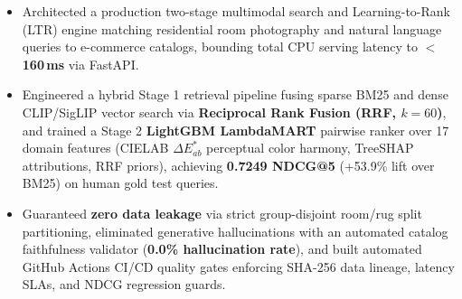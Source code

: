 

\begin{itemize}
    \item Architected a production two-stage multimodal search and Learning-to-Rank (LTR) engine matching residential room photography and natural language queries to e-commerce catalogs, bounding total CPU serving latency to \textbf{$<$ 160\,ms} via FastAPI.
    \item Engineered a hybrid Stage 1 retrieval pipeline fusing sparse BM25 and dense CLIP/SigLIP vector search via \textbf{Reciprocal Rank Fusion (RRF, $k=60$)}, and trained a Stage 2 \textbf{LightGBM LambdaMART} pairwise ranker over 17 domain features (CIELAB $\Delta E^*_{ab}$ perceptual color harmony, TreeSHAP attributions, RRF priors), achieving \textbf{0.7249 NDCG@5} (+53.9\% lift over BM25) on human gold test queries.
    \item Guaranteed \textbf{zero data leakage} via strict group-disjoint room/rug split partitioning, eliminated generative hallucinations with an automated catalog faithfulness validator (\textbf{0.0\% hallucination rate}), and built automated GitHub Actions CI/CD quality gates enforcing SHA-256 data lineage, latency SLAs, and NDCG regression guards.
\end{itemize}
\gap

